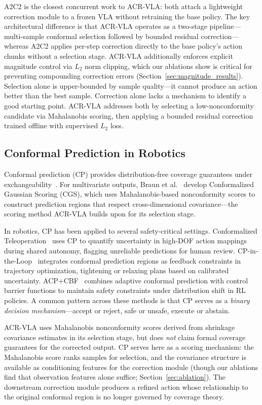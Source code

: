 A2C2 is the closest concurrent work to ACR-VLA: both attach a lightweight correction module to a frozen VLA without retraining the base policy.
The key architectural difference is that ACR-VLA operates as a two-stage pipeline---multi-sample conformal selection followed by bounded residual correction---whereas A2C2 applies per-step correction directly to the base policy's action chunks without a selection stage.
ACR-VLA additionally enforces explicit magnitude control via $L_2$ norm clipping, which our ablations show is critical for preventing compounding correction errors (Section~\ref{sec:magnitude_results}).
Selection alone is upper-bounded by sample quality---it cannot produce an action better than the best sample.
Correction alone lacks a mechanism to identify a good starting point.
ACR-VLA addresses both by selecting a low-nonconformity candidate via Mahalanobis scoring, then applying a bounded residual correction trained offline with supervised $L_2$ loss.

\subsection{Conformal Prediction in Robotics}

Conformal prediction (CP) provides distribution-free coverage guarantees under exchangeability~\cite{angelopoulos2023gentle}.
For multivariate outputs, Braun et al.~\cite{braun2025cgs} develop Conformalized Gaussian Scoring (CGS), which uses Mahalanobis-based nonconformity scores to construct prediction regions that respect cross-dimensional covariance---the scoring method ACR-VLA builds upon for its selection stage.

In robotics, CP has been applied to several safety-critical settings.
Conformalized Teleoperation~\cite{zhao2024conformalized} uses CP to quantify uncertainty in high-DOF action mappings during shared autonomy, flagging unreliable predictions for human review.
CP-in-the-Loop~\cite{wang2025cploop} integrates conformal prediction regions as feedback constraints in trajectory optimization, tightening or relaxing plans based on calibrated uncertainty.
ACP+CBF~\cite{zhou2025acp_cbf} combines adaptive conformal prediction with control barrier functions to maintain safety constraints under distribution shift in RL policies.
A common pattern across these methods is that CP serves as a \emph{binary decision mechanism}---accept or reject, safe or unsafe, execute or abstain.

ACR-VLA uses Mahalanobis nonconformity scores derived from shrinkage covariance estimates in its selection stage, but does \emph{not} claim formal coverage guarantees for the corrected output.
CP serves here as a scoring mechanism: the Mahalanobis score ranks samples for selection, and the covariance structure is available as conditioning features for the correction module (though our ablations find that observation features alone suffice; Section~\ref{sec:ablation}).
The downstream correction module produces a refined action whose relationship to the original conformal region is no longer governed by coverage theory.

